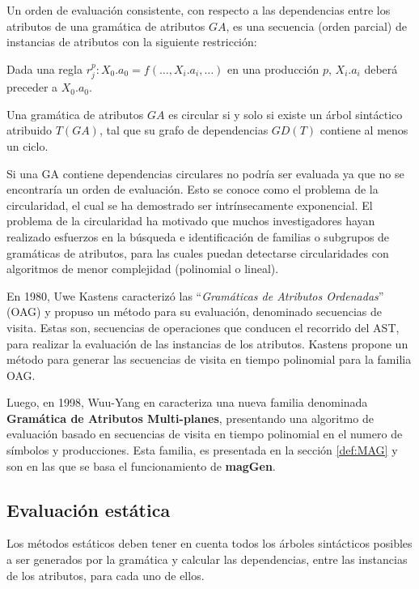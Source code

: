 \documentclass[runningheads,a4paper]{llncs}
\newcommand{\maggen}{\textbf{magGen}}
\begin{document}
\begin{definition} Un orden de evaluación consistente, con respecto a las dependencias entre los atributos de una gramática de atributos $GA$, es una secuencia (orden parcial) de instancias de atributos con la siguiente restricción:

Dada una regla $r_{j}^{p} : X_{0}.a_{0} = f(\ldots, X_{i}.a_{i}, \ldots)$ en una producción $p$, 
$X_{i}.a_{i}$ deberá preceder a $X_{0}.a_{0}$.
\end{definition}

\begin{definition} 
Una gramática de atributos $GA$ es circular si y solo si existe un árbol sintáctico atribuido $T(GA)$, tal que su grafo de dependencias $GD(T)$ contiene al menos un ciclo.
\end{definition}

Si una GA contiene dependencias circulares no podría ser evaluada ya que no se encontraría un orden de evaluación. Esto se conoce como el problema de la circularidad, el cual se ha demostrado ser intrínsecamente exponencial\cite{intri-exc}. El problema de la circularidad ha motivado que muchos investigadores hayan realizado esfuerzos en la búsqueda e identificación de familias o subgrupos de gramáticas de atributos, para las cuales puedan detectarse circularidades con algoritmos de menor complejidad (polinomial o lineal).

En 1980, Uwe Kastens\cite{kastens} caracterizó las ``\textit{Gramáticas de Atributos Ordenadas}'' (OAG) y propuso un método para su evaluación, denominado secuencias de visita. Estas son, secuencias de operaciones que conducen el recorrido del AST, para realizar la evaluación de las instancias de los atributos. Kastens propone un método para generar las secuencias de visita en tiempo polinomial para la familia OAG.

Luego, en 1998, Wuu-Yang en \cite{wuu-yang1} caracteriza una nueva familia denominada \textbf{Gramática de Atributos Multi-planes}, presentando una algoritmo de evaluación basado en secuencias de visita en tiempo polinomial en el numero de símbolos y producciones. Esta familia, es presentada en la sección \ref{def:MAG} y son en las que se basa el funcionamiento de \maggen.

\subsection{Evaluación estática}
\label{subsec:eval-est}
Los métodos estáticos deben tener en cuenta todos los árboles sintácticos posibles a ser generados por la gramática y calcular las dependencias, entre las instancias de los atributos, para cada uno de ellos. 
\end{document}
